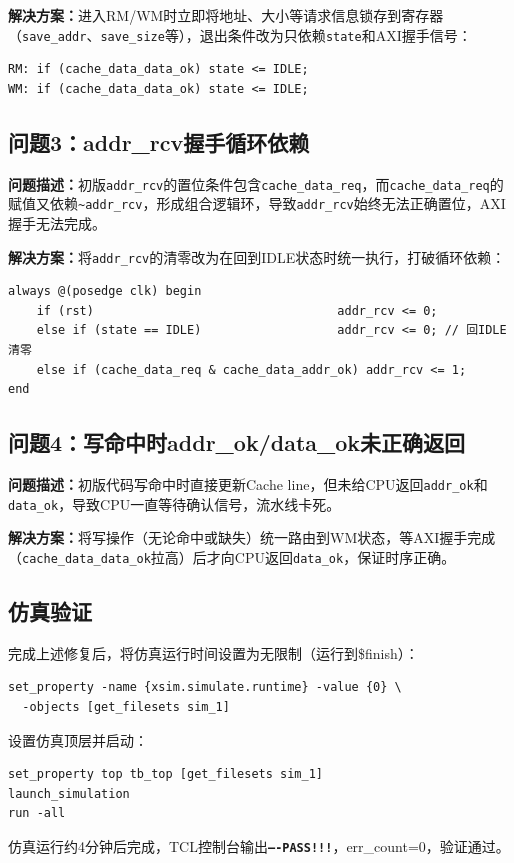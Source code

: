 \textbf{解决方案：}进入RM/WM时立即将地址、大小等请求信息锁存到寄存器（\texttt{save\_addr}、\texttt{save\_size}等），退出条件改为只依赖\texttt{state}和AXI握手信号：

\begin{verbatim}
RM: if (cache_data_data_ok) state <= IDLE;
WM: if (cache_data_data_ok) state <= IDLE;
\end{verbatim}

\subsection{问题3：addr\_rcv握手循环依赖}

\textbf{问题描述：}初版\texttt{addr\_rcv}的置位条件包含\texttt{cache\_data\_req}，而\texttt{cache\_data\_req}的赋值又依赖\texttt{\textasciitilde addr\_rcv}，形成组合逻辑环，导致\texttt{addr\_rcv}始终无法正确置位，AXI握手无法完成。

\textbf{解决方案：}将\texttt{addr\_rcv}的清零改为在回到IDLE状态时统一执行，打破循环依赖：

\begin{verbatim}
always @(posedge clk) begin
    if (rst)                                  addr_rcv <= 0;
    else if (state == IDLE)                   addr_rcv <= 0; // 回IDLE清零
    else if (cache_data_req & cache_data_addr_ok) addr_rcv <= 1;
end
\end{verbatim}

\subsection{问题4：写命中时addr\_ok/data\_ok未正确返回}

\textbf{问题描述：}初版代码写命中时直接更新Cache line，但未给CPU返回\texttt{addr\_ok}和\texttt{data\_ok}，导致CPU一直等待确认信号，流水线卡死。

\textbf{解决方案：}将写操作（无论命中或缺失）统一路由到WM状态，等AXI握手完成（\texttt{cache\_data\_data\_ok}拉高）后才向CPU返回\texttt{data\_ok}，保证时序正确。

\subsection{仿真验证}

完成上述修复后，将仿真运行时间设置为无限制（运行到\$finish）：

\begin{verbatim}
set_property -name {xsim.simulate.runtime} -value {0} \
  -objects [get_filesets sim_1]
\end{verbatim}

设置仿真顶层并启动：

\begin{verbatim}
set_property top tb_top [get_filesets sim_1]
launch_simulation
run -all
\end{verbatim}

仿真运行约4分钟后完成，TCL控制台输出\textbf{\texttt{----PASS!!!}}，err\_count=0，验证通过。
